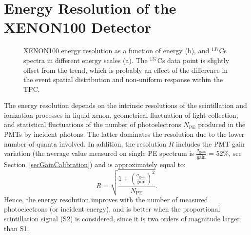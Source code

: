 \section{Energy Resolution of the XENON100 Detector}
\label{secEnergyResolution}

\begin{figure}[!b]
\centering
{}
\caption[XENON100 energy resolution as a function of energy, and $^{137}$Cs spectra in different energy scales]{XENON100 energy resolution as a function of energy (b), and $^{137}$Cs spectra in different energy scales (a). The $^{137}$Cs data point is slightly offset from the trend, which is probably an effect of the difference in the event spatial distribution and non-uniform response within the TPC.}
\label{figEnergyResolution}
\end{figure}

The energy resolution depends on the intrinsic resolutions of the scintillation and ionization processes in liquid xenon, geometrical fluctuation of light collection, and statistical fluctuations of the number of photoelectrons $N_{\mathrm{PE}}$ produced in the PMTs by incident photons. The latter dominates the resolution due to the lower number of quanta involved. In addition, the resolution $R$ includes the PMT gain variation (the average value measured on single PE spectrum is $\frac{\sigma_{\mathrm{gain}}}{\mathrm{gain}}$ = 52\%, see Section~\ref{secGainCalibration}) and is approximately equal to:
\begin{equation}
R = \sqrt{\frac{1+(\frac{\sigma_{\mathrm{gain}}}{\mathrm{gain}})^2}{N_{\mathrm{PE}}}}.
\end{equation}
Hence, the energy resolution improves with the number of measured photoelectrons (or incident energy), and is better when the proportional scintillation signal (S2) is considered, since it is two orders of magnitude larger than S1.

